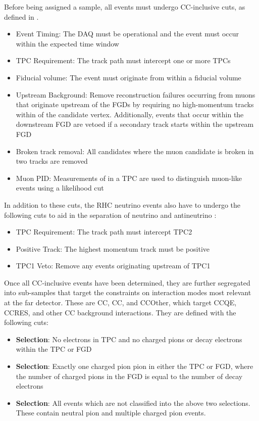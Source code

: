 Before being assigned a sample, all events must undergo CC-inclusive cuts, as defined in .

\begin{itemize}
\item Event Timing: The DAQ must be operational and the event must occur within the expected time window
\item TPC Requirement: The track path must intercept one or more TPCs
\item Fiducial volume: The event must originate from within a fiducial volume
\item Upstream Background: Remove reconstruction failures occurring from muons that originate upstream of the FGDs by requiring no high-momentum tracks within  of the candidate vertex. Additionally, events that occur within the downstream FGD are vetoed if a secondary track starts within the upstream FGD
\item Broken track removal: All candidates where the muon candidate is broken in two tracks are removed
\item Muon PID: Measurements of  in a TPC are used to distinguish muon-like events using a likelihood cut
\end{itemize}

In addition to these cuts, the RHC neutrino events also have to undergo the following cuts to aid in the separation of neutrino and antineutrino :

\begin{itemize}
\item TPC Requirement: The track path must intercept TPC2
\item Positive Track: The highest momentum track must be positive
\item TPC1 Veto: Remove any events originating upstream of TPC1
\end{itemize}

Once all CC-inclusive events have been determined, they are further segregated into sub-samples that target the constraints on interaction modes most relevant at the far detector. These are CC\quickmath{0\pi}, CC\quickmath{1\pi}, and CCOther, which target CCQE, CCRES, and other CC background interactions. They are defined with the following cuts:

\begin{itemize}
\item \textbf{ Selection}: No electrons in TPC and no charged pions or decay electrons within the TPC or FGD
\item \textbf{ Selection}: Exactly one charged pion pion in either the TPC or FGD, where the number of charged pions in the FGD is equal to the number of decay electrons
\item \textbf{ Selection}: All events which are not classified into the above two selections. These contain neutral pion and multiple charged pion events.
\end{itemize}

